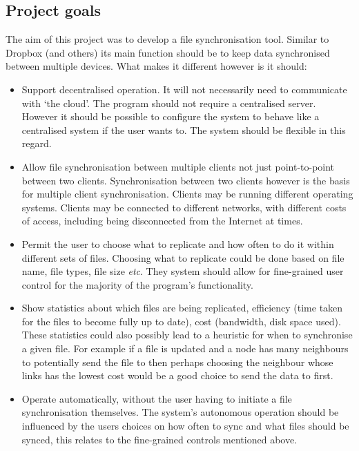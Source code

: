 \documentclass[12pt]{article}
\begin{document}
\subsection{Project goals}
The aim of this project was to develop a file synchronisation tool.
Similar to  Dropbox (and others) its main function should be to
keep data synchronised between multiple devices.
What makes it different however is it should:
\begin{itemize}
\item Support decentralised operation. It will not necessarily need to communicate with
`the cloud'. The program should not require a
centralised server. However it should be
possible to configure the system to behave like a centralised system if the user wants to.
The system should be flexible in this regard.

\item Allow file synchronisation between multiple clients not just point-to-point
between two clients. Synchronisation between two clients however is the
basis for multiple client synchronisation. Clients may be
running different operating systems. Clients may be connected to
different networks, with different costs of access, including being disconnected
from the Internet at times.

\item Permit the user to choose what to replicate and how often to do
it within different sets of files. Choosing what to replicate could be done
based on file name, file types, file size \emph{etc}. They system should
allow for fine-grained user control for the majority of the program's functionality.

\item Show statistics about which files are being replicated, efficiency (time
taken for the files to become fully up to date),
cost (bandwidth, disk space used). These statistics could also possibly lead
to a heuristic for when to synchronise a given file. For example if a file is
updated and a node has many neighbours to potentially send the file to then perhaps
choosing the neighbour whose links has the lowest cost would be a good choice
to send the data to first.

\item Operate automatically, without the user having to initiate a file
synchronisation themselves. 
The system's autonomous operation should be influenced by the users
choices on how often to sync and what files should be synced, this
relates to the fine-grained controls mentioned above.
\end{itemize}
\end{document}
